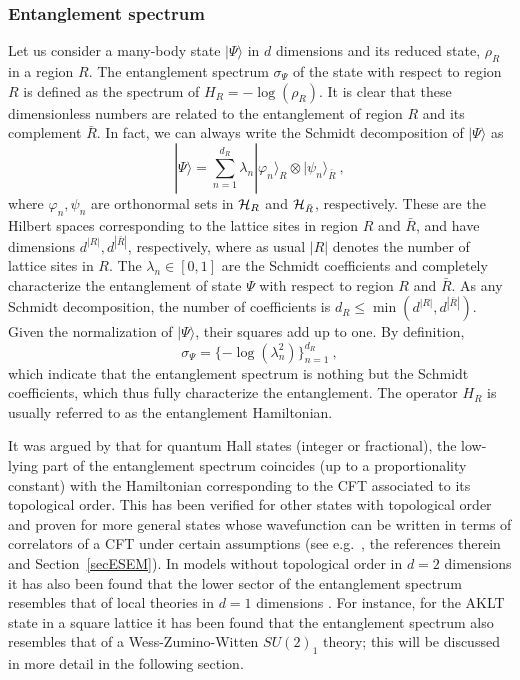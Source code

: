 \documentclass[rmp,aps,reprint,superscriptaddress,nobalancelastpage]{revtex4-1}
\newcommand{\be}{\begin{equation}}
\newcommand{\ee}{\end{equation}}
\newcommand{\ket}[1]{\vert#1\rangle}
\begin{document}
\subsubsection{Entanglement spectrum}

Let us consider a many-body state $\ket\Psi$ in $d$ dimensions and its reduced state, $\rho_R$ in a region $R$. The entanglement spectrum $\sigma_\Psi$ of the state with respect to region $R$ is defined as the spectrum of $H_R=-\log(\rho_R)$. It is clear that these dimensionless numbers are related to the entanglement of region $R$ and its complement $\bar R$. In fact, we can always write the Schmidt decomposition of $\ket\Psi$ as
\be
    |\Psi\rangle = \sum_{n=1}^{d_R} \lambda_n |\varphi_n\rangle_R\otimes|\psi_n\rangle_{\bar R}\ ,
\ee
where $\varphi_n,\psi_n$ are orthonormal sets in ${\cal H}_R$ and ${\cal H}_{\bar R}$, respectively. These are the Hilbert spaces corresponding to the lattice sites in region $R$ and $\bar R$, and have dimensions $d^{|R|},d^{|\bar R|}$, respectively, where as usual $|R|$ denotes the number of lattice sites in $R$. The $\lambda_n\in [0,1]$ are the Schmidt coefficients and completely characterize the entanglement of state $\Psi$ with respect to region $R$ and $\bar R$. As any Schmidt decomposition, the number of coefficients is $d_R\le \min(d^{|R|},d^{|\bar R|})$.  Given the normalization of $\ket\Psi$, their squares add up to one. By definition,
\be
    \sigma_\Psi = \{ -\log(\lambda_n^2)\}_{n=1}^{d_R}\ ,
\ee
which indicate that the entanglement spectrum is nothing but the Schmidt coefficients, which thus fully characterize the entanglement. The operator $H_R$ is usually referred to as the entanglement Hamiltonian.

It was argued by \citet{li:es-qhe-sphere} that for quantum Hall states (integer or fractional), the low-lying part of the entanglement spectrum coincides (up to a proportionality constant) with the Hamiltonian corresponding to the  CFT associated to its topological order. This has been verified for other states with topological order and proven for more general states whose wavefunction can be written in terms of correlators of a CFT under certain assumptions (see e.g.\ , the references therein and Section~\ref{secESEM}). In models without topological order in $d=2$ dimensions it has also been found that the lower sector of the entanglement spectrum resembles that of local theories in $d=1$ dimensions \cite{lou:entanglement-spectra,cirac:peps-boundaries}. For instance, for the AKLT state in a square lattice it has been found that the entanglement spectrum also resembles that of a Wess-Zumino-Witten $SU(2)_1$ theory; this will be discussed in more detail in the following section.
\end{document}
